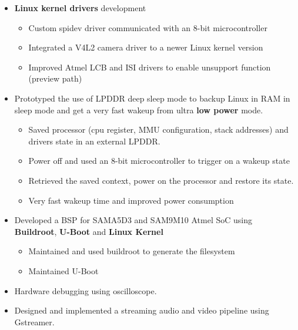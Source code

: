 \documentclass[10pt,a4paper]{altacv}
\begin{document}
\begin{paracol}{2}
\begin{itemize}
\item \textbf{\textcolor{bold}{Linux kernel drivers}} development
\begin{itemize}
    \item Custom spidev driver communicated with an 8-bit microcontroller
    \item Integrated a V4L2 camera driver to a newer Linux kernel version
    \item Improved Atmel LCB and ISI drivers to enable unsupport function (preview path)
\end{itemize}
\item Prototyped the use of LPDDR deep sleep mode to backup Linux in RAM in sleep mode and get a very fast wakeup from ultra \textbf{\textcolor{bold}{low power}} mode.
\begin{itemize}
    \item Saved processor (cpu register, MMU configuration, stack addresses) and drivers state in an external LPDDR.
    \item Power off and used an 8-bit microcontroller to trigger on a wakeup state
    \item Retrieved the saved context, power on the processor and restore its state.
    \item Very fast wakeup time and improved power consumption
\end{itemize}
\item Developed a BSP for SAMA5D3 and SAM9M10 Atmel SoC using \textbf{\textcolor{bold}{Buildroot}}, \textbf{\textcolor{bold}{U-Boot}} and \textbf{\textcolor{bold}{Linux  Kernel}}
\begin{itemize}
    \item Maintained and used buildroot to generate the filesystem
    \item Maintained U-Boot
\end{itemize}
\item Hardware debugging using oscilloscope.
\item Designed and implemented a streaming audio and video pipeline using Gstreamer.
\end{itemize}


\end{paracol}
\end{document}
